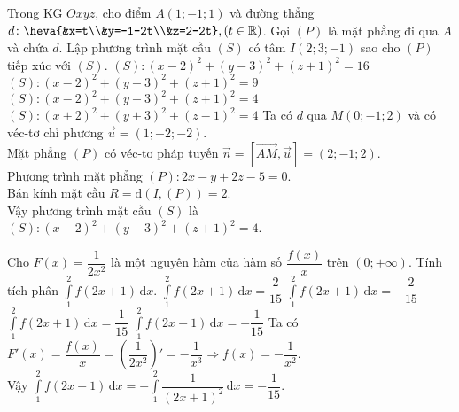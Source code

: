 \begin{ex}%
Trong KG $Oxyz$, cho điểm $A(1;-1;1)$ và đường thẳng $d \colon \heva{&x=t\\&y=-1-2t\\&z=2-2t}, (t\in \mathbb{R})$. Gọi
$(P)$ là mặt phẳng đi qua $A$ và chứa $d$. Lập phương trình mặt cầu $(S)$ có tâm $I(2; 3;-1)$ sao cho $(P)$ tiếp xúc với $(S)$.
\choice
{$(S)\colon(x-2)^2+(y-3)^2+(z+1)^2=16$}
{$(S)\colon(x-2)^2+(y-3)^2+(z+1)^2=9$}
{\True $(S)\colon(x-2)^2+(y-3)^2+(z+1)^2=4$}
{$(S)\colon(x+2)^2+(y+3)^2+(z-1)^2=4$}
\loigiai
{Ta có 
$d$ qua $M(0;- 1; 2)$ và có véc-tơ chỉ phương $\overrightarrow{u}=(1; - 2; - 2)$.\\
Mặt phẳng $(P)$ có véc-tơ pháp tuyến $\overrightarrow{n}=[\overrightarrow{AM},\overrightarrow{u}]=(2;- 1; 2)$.\\
Phương trình mặt phẳng $(P)\colon 2 x - y +2 z -5 = 0$.\\
Bán kính mặt cầu $R= \mathrm{d}(I,(P)) =2$.\\
Vậy phương trình mặt cầu $(S)$ là $(S)\colon(x-2)^2+(y-3)^2+(z+1)^2=4$.
}
\end{ex}

\begin{ex}%
Cho $F(x)=\dfrac{1}{2x^2}$ là một nguyên hàm của hàm số $\dfrac{f(x)}{x}$ trên $(0;+\infty)$. Tính tích phân $\displaystyle\int\limits_1^2f(2x+1)\mathrm{\,d}x.$
\choice
{$\displaystyle\int\limits_1^2f(2x+1)\mathrm{\,d}x=\dfrac{2}{15}$}
{$\displaystyle\int\limits_1^2f(2x+1)\mathrm{\,d}x=-\dfrac{2}{15}$}
{$\displaystyle\int\limits_1^2f(2x+1)\mathrm{\,d}x=\dfrac{1}{15}$}
{\True $\displaystyle\int\limits_1^2f(2x+1)\mathrm{\,d}x=-\dfrac{1}{15}$}
\loigiai
{Ta có $F'(x)=\dfrac{f(x)}{x}=\left(\dfrac{1}{2x^2}\right)'=-\dfrac{1}{x^3}\Rightarrow f(x)=-\dfrac{1}{x^2}$.\\
Vậy $\displaystyle\int\limits_1^2f(2x+1)\mathrm{\,d}x=-\displaystyle\int\limits_1^2\dfrac{1}{(2x+1)^2}\mathrm{\,d}x=-\dfrac{1}{15}.$
}
\end{ex}

